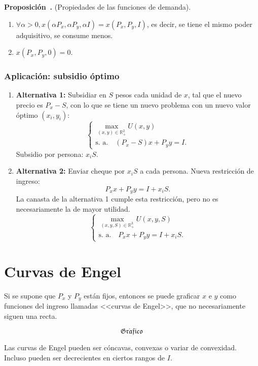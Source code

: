 \documentclass{report}
\newcommand{\GRAF}{\begin{center}$$\mathfrak{Gr\acute{a}fico}$$\end{center}}
\newcounter{theorem}[chapter]
\newenvironment{prop}[1]{\refstepcounter{theorem}\noindent\setlength{\parskip}{0pt}\textbf{Proposición~\thechapter.\thetheorem} (#1).}{}
\begin{document}
\begin{prop}{Propiedades de las funciones de demanda}
\begin{enumerate}
\item $\forall\alpha>0,x\!\left(\alpha P_x,\alpha P_y,\alpha I\right)=x\!\left(P_x,P_y,I\right)$, es decir, se tiene el mismo poder adquisitivo, se consume menos.
\item $x\!\left(P_x,P_y,0\right)=0$.
\end{enumerate}
\end{prop}

\subsubsection{Aplicación: subsidio óptimo}

\begin{enumerate}
\item \textbf{Alternativa 1:} Subsidiar en $S$ pesos cada unidad de $x$, tal que el nuevo precio es $P_x-S$, con lo que se tiene un nuevo problema con un nuevo valor óptimo $\left(x_i,y_i\right)$:
$$\left\{
\begin{matrix}
\displaystyle{\max_{(x,y)\in\mathbb{R}_+^2}U\!\left(x,y\right)} \\
\text{s. a.}\quad \left(P_x-S\right)x+P_yy=I\text{.}
\end{matrix}\right.$$
Subsidio por persona: $x_iS$.
\item \textbf{Alternativa 2:} Enviar cheque por $x_iS$ a cada persona. Nueva restricción de ingreso:
$$P_xx+P_yy=I+x_iS\text{.}$$
La canasta de la alternativa 1 cumple esta restricción, pero no es necesariamente la de mayor utilidad.
$$\left\{
\begin{matrix}
\displaystyle{\max_{(x,y,S)\in\mathbb{R}_+^3}U\!\left(x,y,S\right)} \\
\text{s. a.}\quad P_xx+P_yy=I+x_iS\text{.}
\end{matrix}\right.$$
\end{enumerate}

\section{Curvas de Engel}

Si se supone que $P_x$ y $P_y$ están fijos, entonces se puede graficar $x$ e $y$ como funciones del ingreso llamadas <<curvas de Engel>>, que no necesariamente siguen una recta.

\GRAF

Las curvas de Engel pueden ser cóncavas, convexas o variar de convexidad. Incluso pueden ser decrecientes en ciertos rangos de $I$.
\end{document}
